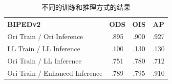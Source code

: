 \documentclass[a4paper]{ctexart}
\begin{document}
		\begin{table}[!htbp]
			\centering
			\small
				\begin{tabular}{>{\centering\arraybackslash}m{5cm} c c c}
					
					\hline
					
					\textbf{BIPEDv2} & \textbf{ODS} & \textbf{OIS} & \textbf{AP}  \\
					
					\hline
					
					Ori Train / Ori Inference  & .895 & .900 & .927 \\
					
					LL Train / LL Inference    & .100 & .130 & .130 \\

					Ori Train / LL Inference   & .751 & .780 & .712 \\
					
					Ori Train / Enhanced Inference & .789 & .795 & .910 \\				
					\hline
					
				\end{tabular}
			\caption{
				\label{tab: Result}
				不同的训练和推理方式的结果} %
			
		\end{table}
		
\end{document}
